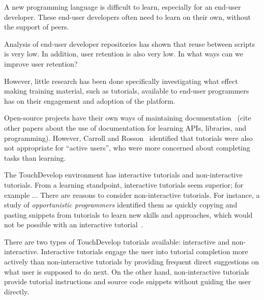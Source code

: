  A new programming language is difficult to learn, especially for an end-user developer. These end-user developers often need to learn on their own, without the support of peers.

Analysis of end-user developer repositories
\cite{athreya2012:touchdevelop,bogart2008:coscripter,sihan2013:touchdevelop,stolee2013:yahoopipes} has shown that reuse between scripts is very low. In addition, user retention is also very low. In what ways can we improve user retention? 

However, little research has been done specifically investigating what effect making training material, such as tutorials, available to end-user programmers has on their engagement and adoption of the platform.

Open-source projects have their own ways of maintaining documentation~\cite{dagenais2010} (cite other papers about the use of documentation for learning APIs, libraries, and programming). However, Carroll and Rosson~\cite{carroll_paradox_1987} identified that tutorials were also not appropriate for ``active users'', who were more concerned about completing tasks than learning.

The TouchDevelop environment has interactive tutorials and non-interactive tutorials. From a learning standpoint, interactive tutorials seem superior; for example ...  There are reasons to consider non-interactive tutorials. For instance, a study of \emph{opportunistic programmers} identified them as quickly copying and pasting snippets from tutorials to learn new skills and approaches, which would not be possible with an interactive tutorial~\cite{brandt2009:opportunistic}.




There are two types of TouchDevelop tutorials available: interactive and non-interactive. Interactive tutorials engage the user into tutorial completion more actively than non-interactive tutorials by providing frequent direct suggestions on what user is supposed to do next. On the other hand, non-interactive tutorials provide tutorial instructions and source code snippets without guiding the user directly.
